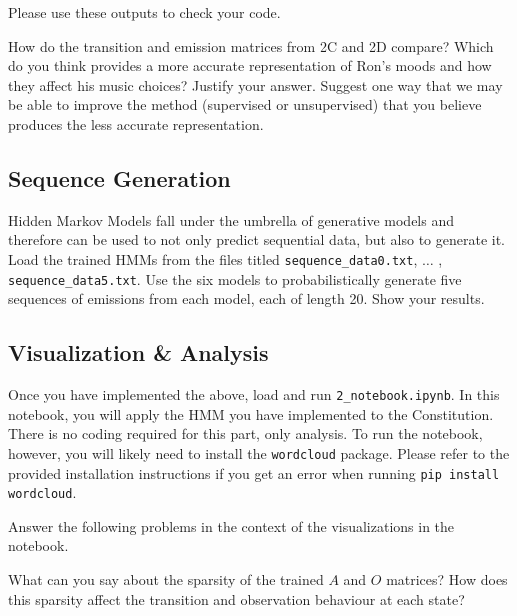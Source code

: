 Please use these outputs to check your code.

\begin{solution}
\end{solution}

\problem[5] How do the transition and emission matrices from 2C and 2D compare? Which do you think provides a more accurate representation of Ron's moods and how they affect his music choices? Justify your answer. Suggest one way that we may be able to improve the method (supervised or unsupervised) that you believe produces the less accurate representation. 

\begin{solution}
\end{solution}

\subsection{Sequence Generation}
Hidden Markov Models fall under the umbrella of generative models and therefore can be used to not only predict sequential data, but also to generate it. 
\problem[5] Load the trained HMMs from the files titled \texttt{sequence_data0.txt}, $\ldots$ , \texttt{sequence_data5.txt}. Use the six models to probabilistically generate five sequences of emissions from each model, each of length 20. Show your results. 

\begin{solution}
\end{solution}

\subsection{Visualization \& Analysis}

Once you have implemented the above, load and run \texttt{2_notebook.ipynb}. In this notebook, you will apply the HMM you have implemented to the Constitution. There is no coding required for this part, only analysis. To run the notebook, however, you will likely need to install the \texttt{wordcloud} package. Please refer to the provided installation instructions if you get an error when running \texttt{pip install wordcloud}.

Answer the following problems in the context of the visualizations in the notebook.

\indent\problem[3] %
What can you say about the sparsity of the trained $A$ and $O$ matrices? How does this sparsity affect the transition and observation behaviour at each state?
\begin{solution}
\end{solution}


